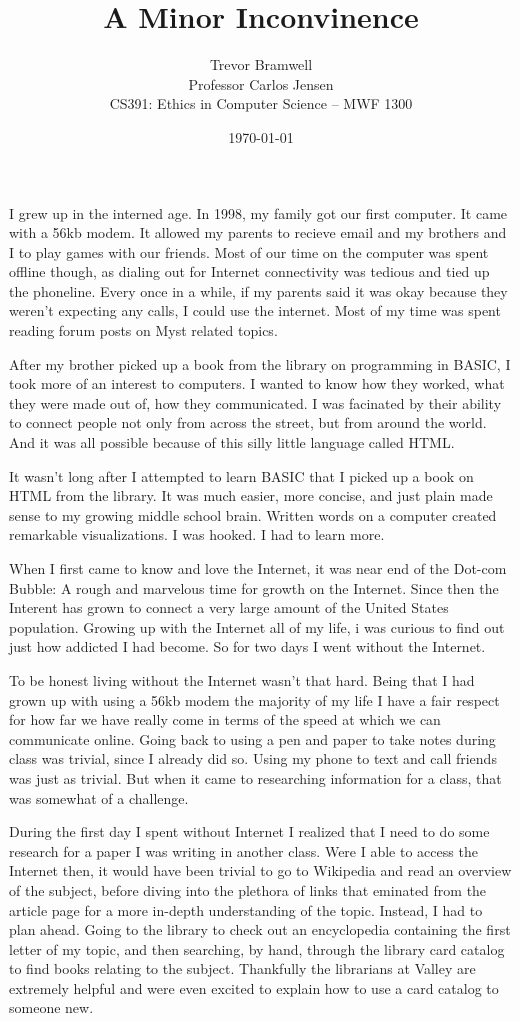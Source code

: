 \documentclass[12pt,letterpaper]{article}
\title{A Minor Inconvinence}
\author{
    Trevor Bramwell\\
    Professor Carlos Jensen\\
    CS391: Ethics in Computer Science -- MWF 1300\\
}
\date{\today}
\begin{document}
\maketitle

I grew up in the interned age. In 1998, my family got our first
computer. It came with a 56kb modem. It allowed my parents to recieve
email and my brothers and I to play games with our friends. Most of our
time on the computer was spent offline though, as dialing out for
Internet connectivity was tedious and tied up the phoneline. Every once
in a while, if my parents said it was okay because they weren't
expecting any calls, I could use the internet. Most of my time was
spent reading forum posts on Myst related topics.

After my brother picked up a book from the library on programming in
BASIC, I took more of an interest to computers. I wanted to know how
they worked, what they were made out of, how they communicated. I was
facinated by their ability to connect people not only from across the
street, but from around the world. And it was all possible because of
this silly little language called HTML. 

It wasn't long after I attempted to learn BASIC that I picked up a book
on HTML from the library. It was much easier, more concise, and just
plain made sense to my growing middle school brain. Written words on a
computer created remarkable visualizations. I was hooked. I had to learn
more.

When I first came to know and love the Internet, it was near end of the
Dot-com Bubble: A rough and marvelous time for growth on the Internet.
Since then the Interent has grown to connect a very large amount of the
United States population. Growing up with the Internet all of my life,
i was curious to find out just how addicted I had become. So for two days I went
without the Internet. 

To be honest living without the Internet wasn't that hard. Being that I
had grown up with using a 56kb modem the majority of my life I have a
fair respect for how far we have really come in terms of the speed at
which we can communicate online. Going back to using a pen and paper to
take notes during class was trivial, since I already did so. Using my
phone to text and call friends was just as trivial. But when it came to
researching information for a class, that was somewhat of a challenge.

During the first day I spent without Internet I realized that I need to
do some research for a paper I was writing in another class. Were I
able to access the Internet then, it would have been trivial to go to
Wikipedia and read an overview of the subject, before diving into the
plethora of links that eminated from the article page for a more
in-depth understanding of the topic. Instead, I had to plan ahead. Going
to the library to check out an encyclopedia containing the first letter
of my topic, and then searching, by hand, through the library card
catalog to find books relating to the subject. Thankfully the librarians
at Valley are extremely helpful and were even excited to explain how to
use a card catalog to someone new. 
\end{document}
